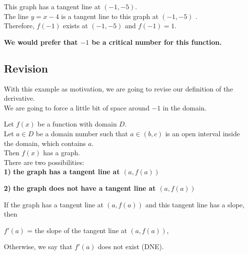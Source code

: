 \documentclass{ximera}
\begin{document}
This graph has a tangent line at $(-1,-5)$.  \\

The line $y = x - 4$ is a tangent line to this graph at $(-1,-5)$ . \\

Therefore, $f(-1)$ exists at $(-1,-5)$ and $f(-1) = 1$.  \\


\begin{center}
\textbf{\textcolor{red!80!black}{We would prefer that $-1$ be a critical number for this function.}}
\end{center}














\subsection{Revision}


With this example as motivation, we are going to revise our definition of the derivative. \\


We are going to force a little bit of space around $-1$ in the domain. \\




\begin{definition}

Let $f(x)$ be a function with domain $D$. \\
Let $a \in D$ be a domain number such that $a \in (b, c)$ is an open interval inside the domain, which contains $a$. \\

Then $f(x)$ has a graph. \\

There are two possibilities:  \\


\textbf{\textcolor{blue!55!black}{1)}} \textbf{the graph has a tangent line at $(a, f(a))$}

\textbf{\textcolor{blue!55!black}{2)}} \textbf{the graph does not have a tangent line at $(a, f(a))$}




If the graph has a tangent line at $(a, f(a))$ and this tangent line has a slope, then


\begin{center}

$f'(a)$ = the slope of the tangent line at $(a, f(a))$,

\end{center}



Otherwise, we say that $f'(a)$ does not exist (DNE).






\end{definition}
\end{document}
